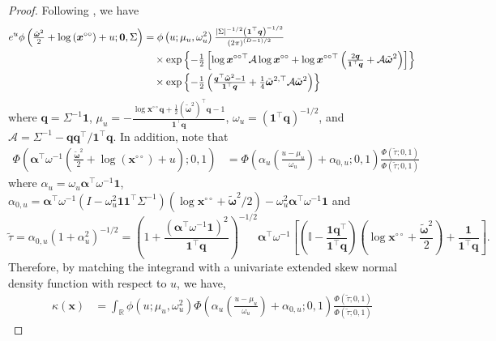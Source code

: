 \documentclass[lineno]{biometrika}
\begin{document}
\begin{proof}
Following \citet{Wadsworth.Tawn:2014}, we have
%
\begin{align*}
e^{u} \phi\left( {\textstyle{\tilde{\bm \omega}^2\over2}} + \log\left(\bm x^{\circ\circ}\right) + u; \bm 0, \Sigma\right) &=
\phi \left( u; \mu_u, \omega_u^2 \right) 
{\textstyle{| \Sigma |^{-1/2} \left( \bm 1^\top \bm q\right)^{-1/2}\over\left( 2\pi \right)^{(D-1)/2}}} \\
&\quad \times \exp \left\{ -{\textstyle{1\over2}} \left[ \log \bm x^{\circ\circ\top} \mathcal{A} \log \bm x^{\circ\circ} + \log \bm x^{\circ\circ\top} \left( {\textstyle{2 \bm q\over\bm 1^\top \bm q}} + {\mathcal A}\tilde{\bm\omega}^2\right) \right]\right\} \\
& \quad \times \exp \left\{- {\textstyle{1\over2}} \left( {\textstyle{\bm q^\top\tilde{\bm \omega}^2 - 1\over\bm 1 ^\top \bm q}} + {\textstyle{1\over4}}\tilde{\bm\omega}^{2,\top}{\mathcal A}\tilde{\bm\omega}^2\right) \right\}
\end{align*}
%
where $\bm q = \Sigma^{-1} \bm 1$, $\mu_u=-\frac{\log \bm x^{\circ\circ}\bm q + \frac{1}{2} \left(\tilde{\bm \omega}^2\right)^\top \bm q - 1}{\bm 1^\top \bm q}$, $\omega_u=\left( \bm 1^\top \bm q \right)^{-1/2}$, and $\mathcal{A} = \Sigma^{-1} - \bm q \bm q^\top / \bm 1^\top \bm q$. In addition, note that
%
\begin{align*}
\Phi\left( \bm \alpha^\top \omega^{-1} \left( \frac{\tilde{\bm \omega}^2}{2} + \log\left(\bm x^{\circ\circ}\right) + u \right); 0, 1\right) 
&= \Phi\left( \alpha_u\left(\frac{u-\mu_u}{\omega_u}\right) + \alpha_{0,u};0,1\right)\frac{\Phi(\tilde{\tau};0,1)}{\Phi(\tilde{\tau};0,1)}
\end{align*}
where $\alpha_u = \omega_u\bm\alpha^\top\omega^{-1}\bm 1$, $\alpha_{0,u} = \bm\alpha^\top\omega^{-1}\left(I - \omega_u^2\bm 1\bm 1^\top \Sigma^{-1}\right)\left(\log \bm x^{\circ\circ}+\tilde{\bm\omega}^2/2\right) - \omega_u^2\bm\alpha^\top\omega^{-1}\bm 1$ and 
%
\begin{equation}
\label{eq:tilde_tau}
\tilde{\tau} = \alpha_{0,u}(1+\alpha_u^2)^{-1/2}= \left(1 + \frac{(\bm\alpha^\top\omega^{-1}\bm 1)^2}{\bm 1^\top \bm q}\right)^{-1/2}\bm\alpha^\top\omega^{-1}\left[\left(\mathbb{I} - \frac{\bm 1\bm q^\top}{\bm 1^\top\bm q}\right)\left(\log \bm x^{\circ\circ} + \frac{\tilde{\bm\omega}^2}{2}\right) +  \frac{\bm 1}{\bm 1^\top \bm q} \right].
\end{equation}
%
Therefore, by matching the integrand with a univariate extended skew normal density function with respect to $u$,  we have,
\begin{align*}
\kappa(\bm x) &=  \int_{\mathbb R} \phi \left( u; \mu_u, \omega_u^2 \right) \Phi\left( \alpha_u\left(\frac{u-\mu_u}{\omega_u}\right) + \alpha_{0,u};0,1\right)\frac{\Phi(\tilde{\tau};0,1)}{\Phi(\tilde{\tau};0,1)}

\end{align*}
\end{proof}
\end{document}
